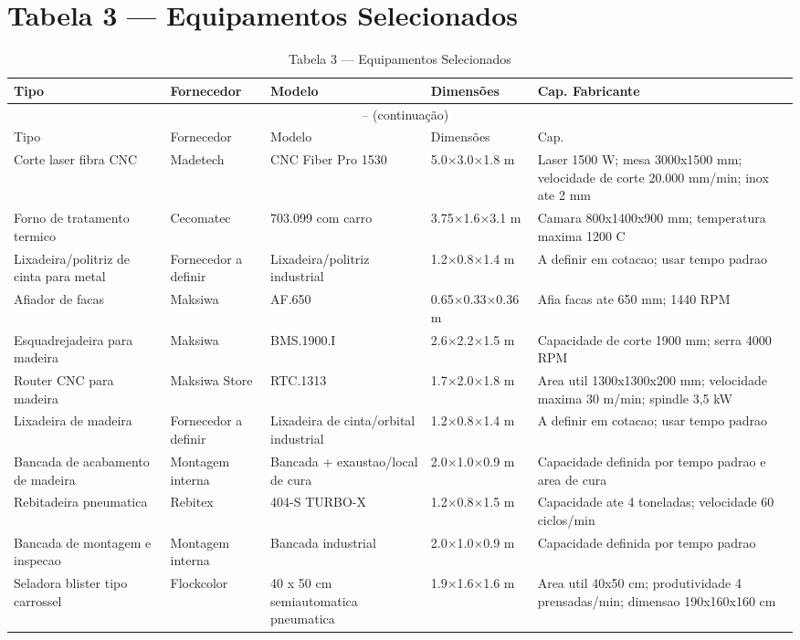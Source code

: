 \documentclass[12pt,a4paper,oneside,english,brazil]{abntex2}
\begin{document}
\chapter{Tabela 3 --- Equipamentos Selecionados}
\begin{longtable}{p{3.5cm}p{2.5cm}p{2.5cm}p{2.8cm}p{3.0cm}}
\caption{Tabela 3 --- Equipamentos Selecionados}\label{tab:equipamentos}\\
\toprule
Tipo & Fornecedor & Modelo & Dimensões & Cap. Fabricante \\
\midrule
\endfirsthead
\multicolumn{5}{c}{\tablename\ \thetable{} -- (continuação)}\\
\toprule Tipo & Fornecedor & Modelo & Dimensões & Cap. \\\midrule
\endhead
  Corte laser fibra CNC & Madetech & CNC Fiber Pro 1530 & 5.0×3.0×1.8 m & Laser 1500 W; mesa 3000x1500 mm; velocidade de corte 20.000 mm/min; inox ate 2 mm \\
  Forno de tratamento termico & Cecomatec & 703.099 com carro & 3.75×1.6×3.1 m & Camara 800x1400x900 mm; temperatura maxima 1200 C \\
  Lixadeira/politriz de cinta para metal & Fornecedor a definir & Lixadeira/politriz industrial & 1.2×0.8×1.4 m & A definir em cotacao; usar tempo padrao \\
  Afiador de facas & Maksiwa & AF.650 & 0.65×0.33×0.36 m & Afia facas ate 650 mm; 1440 RPM \\
  Esquadrejadeira para madeira & Maksiwa & BMS.1900.I & 2.6×2.2×1.5 m & Capacidade de corte 1900 mm; serra 4000 RPM \\
  Router CNC para madeira & Maksiwa Store & RTC.1313 & 1.7×2.0×1.8 m & Area util 1300x1300x200 mm; velocidade maxima 30 m/min; spindle 3,5 kW \\
  Lixadeira de madeira & Fornecedor a definir & Lixadeira de cinta/orbital industrial & 1.2×0.8×1.4 m & A definir em cotacao; usar tempo padrao \\
  Bancada de acabamento de madeira & Montagem interna & Bancada + exaustao/local de cura & 2.0×1.0×0.9 m & Capacidade definida por tempo padrao e area de cura \\
  Rebitadeira pneumatica & Rebitex & 404-S TURBO-X & 1.2×0.8×1.5 m & Capacidade ate 4 toneladas; velocidade 60 ciclos/min \\
  Bancada de montagem e inspecao & Montagem interna & Bancada industrial & 2.0×1.0×0.9 m & Capacidade definida por tempo padrao \\
  Seladora blister tipo carrossel & Flockcolor & 40 x 50 cm semiautomatica pneumatica & 1.9×1.6×1.6 m & Area util 40x50 cm; produtividade 4 prensadas/min; dimensao 190x160x160 cm \\
\bottomrule
\end{longtable}
\end{document}
